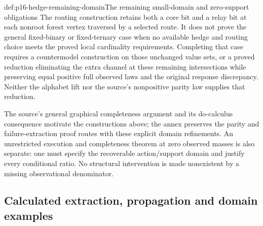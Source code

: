 \begin{proofboundary}{def:p16-hedge-remaining-domain}{The remaining small-domain and zero-support obligations}
The routing construction retains both a core bit and a relay bit
at each nonroot forest vertex traversed by a selected route. It
does not prove the general fixed-binary or fixed-ternary case when
no available hedge and routing choice meets the proved local
cardinality requirements. Completing that case requires a countermodel
construction on those unchanged value sets, or a proved reduction
eliminating the extra channel at these remaining intersections while
preserving equal positive full observed laws and the original response
discrepancy.
Neither the alphabet lift nor the source's nonpositive parity law
supplies that reduction.

The source's general graphical completeness argument and its
do-calculus consequence motivate the constructions above; the
annex preserves the parity and failure-extraction proof routes
with these explicit domain refinements. An unrestricted execution
and completeness theorem at zero observed masses is also separate:
one must specify the recoverable action/support domain and justify
every conditional ratio. No structural intervention is made nonexistent
by a missing observational denominator.
\end{proofboundary}

\subsection{Calculated extraction, propagation and domain examples}

